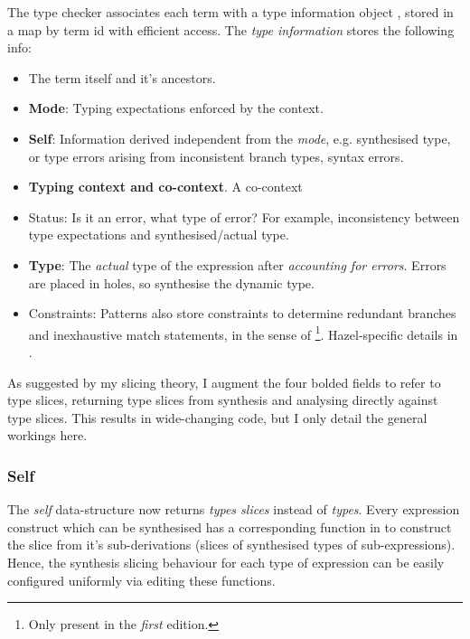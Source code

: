 The type checker associates each term with a type information object , stored in a map by term id with efficient access. The \textit{type information} stores the following info:
\begin{itemize}
\item The term itself and it's ancestors.
\item \textbf{Mode}: Typing expectations enforced by the context.
\item \textbf{Self}: Information derived independent from the \textit{mode}, e.g. synthesised type, or type errors arising from inconsistent branch types, syntax errors.
\item \textbf{Typing context and co-context}. A co-context
\item Status: Is it an error, what type of error? For example, inconsistency between type expectations and synthesised/actual type.
\item \textbf{Type}: The \textit{actual} type of the expression after \textit{accounting for errors}. Errors are placed in holes, so synthesise the dynamic type. 
\item Constraints: Patterns also store constraints to determine redundant branches and inexhaustive match statements, in the sense of \cite[ch. 13]{PracticalFoundationsEd1}\footnote{Only present in the \textit{first} edition.}. Hazel-specific details in \cite{LivePatternMatching}.
\end{itemize}

As suggested by my slicing theory, I augment the four bolded fields to refer to type slices, returning type slices from synthesis and analysing directly against type slices. This results in wide-changing code, but I only detail the general workings here.

\subsubsection{Self}
The \textit{self} data-structure now returns \textit{types slices} instead of \textit{types}. Every expression construct which can be synthesised has a corresponding function in  to construct the slice from it's sub-derivations (slices of synthesised types of sub-expressions). Hence, the synthesis slicing behaviour for each type of expression can be easily configured uniformly via editing these functions.

